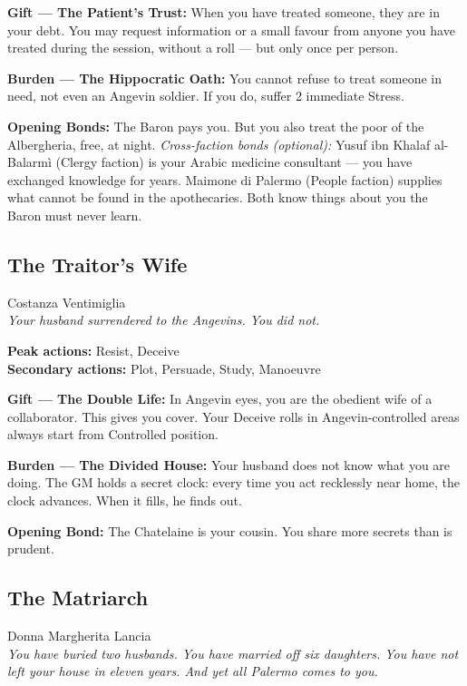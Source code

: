 \textbf{Gift --- The Patient's Trust:} When you have treated someone,
they are in your debt. You may request information or a small favour
from anyone you have treated during the session, without a roll —
but only once per person.

\textbf{Burden --- The Hippocratic Oath:} You cannot refuse to treat
someone in need, not even an Angevin soldier. If you do, suffer
2 immediate Stress.

\textbf{Opening Bonds:} The Baron pays you. But you also treat the
poor of the Albergheria, free, at night. \textit{Cross-faction bonds
(optional):} Yusuf ibn Khalaf al-Balarmì (Clergy faction) is your
Arabic medicine consultant — you have exchanged knowledge for years.
Maimone di Palermo (People faction) supplies what cannot be found in
the apothecaries. Both know things about you the Baron must never learn.

\filetto

\subsection{The Traitor's Wife}
{\cinzel\footnotesize\color{grigionote} Costanza Ventimiglia}\\
\textit{Your husband surrendered to the Angevins. You did not.}

\textbf{Peak actions:} Resist, Deceive\\
\textbf{Secondary actions:} Plot, Persuade, Study, Manoeuvre

\textbf{Gift --- The Double Life:} In Angevin eyes, you are the
obedient wife of a collaborator. This gives you cover. Your Deceive
rolls in Angevin-controlled areas always start from Controlled position.

\textbf{Burden --- The Divided House:} Your husband does not know
what you are doing. The GM holds a secret clock: every time you act
recklessly near home, the clock advances. When it fills, he finds out.

\textbf{Opening Bond:} The Chatelaine is your cousin.
You share more secrets than is prudent.

\filetto

\subsection{The Matriarch}
{\cinzel\footnotesize\color{grigionote} Donna Margherita Lancia}\\
\textit{You have buried two husbands. You have married off six
daughters. You have not left your house in eleven years. And yet
all Palermo comes to you.}


